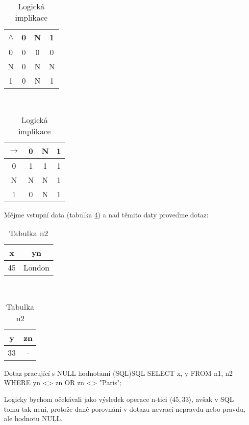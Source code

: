 \begin{table}
\caption{Logické funkce}\label{tab:operace}
\begin{subtable}[t]{0.45\textwidth}
\centering
\caption{Logický součin}
\begin{tabular}{c || c c c}
$\land$ & 0 & N & 1 \\
\hline
0 & 0 & 0 & 0 \\
N & 0 & N & N \\
1 & 0 & N & 1
\end{tabular}
\end{subtable}
~
\begin{subtable}[t]{0.45\textwidth}
\centering
\caption{Logická implikace}
\begin{tabular}{c || c c c}
$\to$ & 0 & N & 1 \\
\hline
0 & 1 & 1 & 1 \\
N & N & N & 1 \\
1 & 0 & N & 1
\end{tabular}
\end{subtable}
\end{table}
\begin{upexample}
Mějme vstupní data (tabulka \ref{tab:null}) a nad těmito daty proveďme dotaz:
\begin{table}
\caption{Příklad relace s NULL hodnotou}\label{tab:null}
\begin{subtable}[t]{0.45\textwidth}
\centering
\caption{Tabulka n1}
\begin{tabular}{c | c}
x & yn \\
\hline
45 & London
\end{tabular}
\end{subtable}
~
\begin{subtable}[t]{0.45\textwidth}
\centering
\caption{Tabulka n2}
\begin{tabular}{c | c}
y & zn \\
\hline
33 & -
\end{tabular}
\end{subtable}
\end{table}
\begin{upcode}{Dotaz pracující s NULL hodnotami (SQL)}{}{SQL}
SELECT	x, y
FROM	n1, n2
WHERE	yn <> zn OR zn <> "Paris";
\end{upcode}
Logicky bychom očekávali jako výsledek operace n-tici $\langle 45,33 \rangle$, avšak v SQL tomu tak není, protože dané porovnání v dotazu nevrací nepravdu nebo pravdu, ale hodnotu NULL.
\end{upexample}

